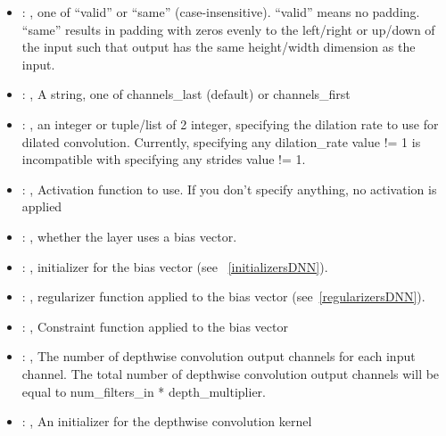 \begin{itemize}
\begin{itemize}
        \item {}: , 
          one of ``valid'' or ``same'' (case-insensitive). ``valid'' means no padding. ``same''
          results in padding         with zeros evenly to the left/right or up/down of the input
          such that output has the same height/width         dimension as the input.

        \item {}: , 
          A string, one of channels\_last (default) or channels\_first

        \item {}: , 
          an integer or tuple/list of 2 integer, specifying the dilation rate to use for dilated
          convolution. Currently, specifying any dilation\_rate value != 1 is incompatible with
          specifying any         strides value != 1.

        \item {}: , 
          Activation function to use. If you don't specify anything, no activation is applied

        \item {}: , 
          whether the layer uses a bias vector.

        \item {}: , 
          initializer for the bias vector (see ~\ref{initializersDNN}).

        \item {}: , 
          regularizer function applied to the bias vector (see~\ref{regularizersDNN}).

        \item {}: , 
          Constraint function applied to the bias vector

        \item {}: , 
          The number of depthwise convolution output channels for each input channel. The total
          number of         depthwise convolution output channels will be equal to num\_filters\_in *
          depth\_multiplier.

        \item {}: , 
          An initializer for the depthwise convolution kernel


\end{itemize}
\end{itemize}
